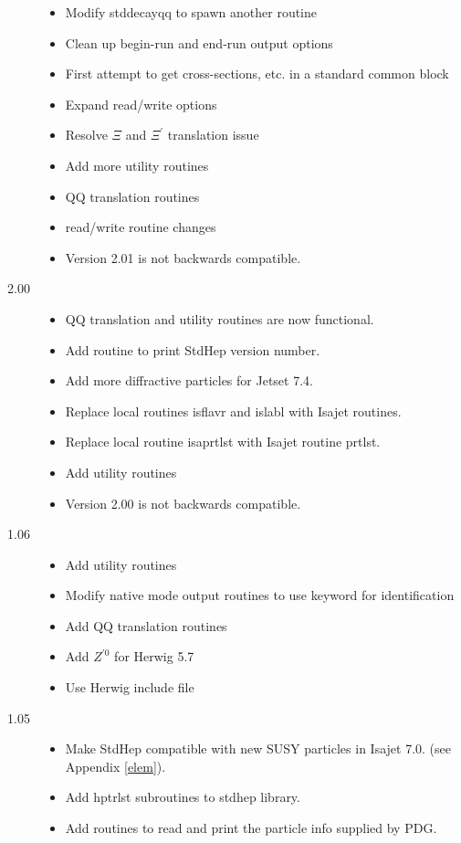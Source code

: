 \begin{description}
\begin{itemize}
\item Modify stddecayqq to spawn another routine
\item Clean up begin-run and end-run output options
\item First attempt to get cross-sections, etc. in a standard common block
\item Expand read/write options
\item Resolve $\Xi$ and $\Xi^{\prime}$ translation issue
\item Add more utility routines
\item QQ translation routines
\item read/write routine changes
\item Version 2.01 is not backwards compatible.
\end{itemize}

\item[2.00]

\begin{itemize}
\item QQ translation and utility routines are now functional.
\item Add routine to print StdHep version number.
\item Add more diffractive particles for Jetset 7.4.
\item Replace local routines isflavr and islabl with Isajet routines.
\item Replace local routine isaprtlst with Isajet routine prtlst.
\item Add utility routines
\item Version 2.00 is not backwards compatible.
\end{itemize}

\item[1.06]

\begin{itemize}
\item Add utility routines
\item Modify native mode output routines to use keyword for identification
\item Add QQ translation routines
\item Add $Z^{\prime 0}$ for Herwig 5.7
\item Use Herwig include file
\end{itemize}

\item[1.05]

\begin{itemize}
\item Make StdHep compatible with new SUSY particles in Isajet 7.0.
(see Appendix \ref{elem}).
\item Add hptrlst subroutines to stdhep library.
\item Add routines to read and print the particle info supplied by PDG.
\end{itemize}


\end{description}
